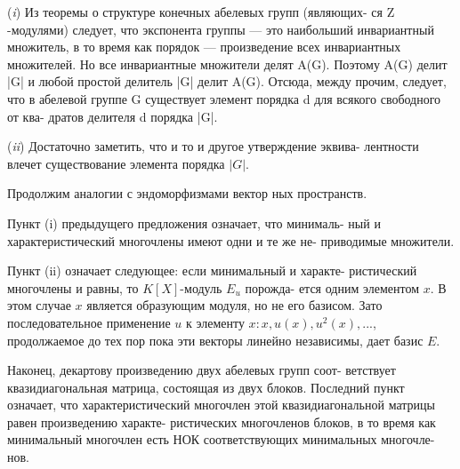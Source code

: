 \documentclass{../template/mai_book}
\begin{document}
\begin{myproof}
\par \quad\;  (\textit{i}) Из теоремы о структуре конечных абелевых групп (являющих­-\linebreak
ся Z -модулями) следует, что экспонента группы — это наибольший\linebreak
инвариантный множитель, в то время как порядок — произведение\linebreak
всех инвариантных множителей. Но все инвариантные множители\linebreak
делят A(G). Поэтому A(G) делит |G| и любой простой делитель |G|\linebreak
делит A(G). Отсюда, между прочим, следует, что в абелевой группе\linebreak
G существует элемент порядка d для всякого свободного от ква-\linebreak­
дратов делителя d порядка |G|.
\par  (\textit{ii}) Достаточно заметить, что и то и другое утверждение эквива­-\linebreak
лентности влечет существование элемента порядка $|G|$.
\end{myproof}
\newpage
\begin{mynotice}
Продолжим аналогии с эндоморфизмами вектор­
ных пространств.

Пункт (i) предыдущего предложения означает, что минималь-\linebreak­
ный и характеристический многочлены имеют одни и те же не­-\linebreak
приводимые множители.

Пункт (ii) означает следующее: если минимальный и характе-\linebreak­
ристический многочлены и равны, то $K[X]$-модуль $E_u$ порожда­-\linebreak
ется одним элементом $x$. В этом случае $x$ является образующим\linebreak
модуля, но не его базисом. Зато последовательное применение $u$\linebreak
к элементу $x: x, u(x), u^2(x),...$, продолжаемое до тех пор пока\linebreak
эти векторы линейно независимы, дает базис $E$.

Наконец, декартову произведению двух абелевых групп соот­-\linebreak
ветствует квазидиагональная матрица, состоящая из двух блоков.\linebreak
Последний пункт означает, что характеристический многочлен\linebreak
этой квазидиагональной матрицы равен произведению характе­-\linebreak
ристических многочленов блоков, в то время как минимальный\linebreak
многочлен есть НОК соответствующих минимальных многочле­-\linebreak
нов.
\end{mynotice}
\end{document}
